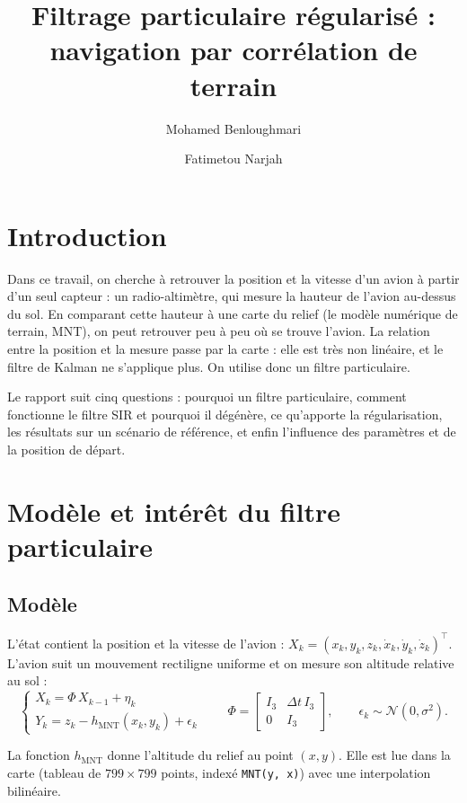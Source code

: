\documentclass[11pt]{article}
\title{Filtrage particulaire régularisé :\\ navigation par corrélation de terrain}
\author{Mohamed Benloughmari \and Fatimetou Narjah}
\date{}
\begin{document}
\maketitle

\section*{Introduction}

Dans ce travail, on cherche à retrouver la position et la vitesse d'un avion à partir d'un
seul capteur : un radio-altimètre, qui mesure la hauteur de l'avion au-dessus du sol.
En comparant cette hauteur à une carte du relief (le modèle numérique de terrain, MNT),
on peut retrouver peu à peu où se trouve l'avion. La relation entre la position et la
mesure passe par la carte : elle est très non linéaire, et le filtre de Kalman
ne s'applique plus. On utilise donc un filtre particulaire.

Le rapport suit cinq questions : pourquoi un filtre particulaire, comment fonctionne
le filtre SIR et pourquoi il dégénère, ce qu'apporte la régularisation, les résultats
sur un scénario de référence, et enfin l'influence des paramètres et de la position de départ.

\section{Modèle et intérêt du filtre particulaire}

\subsection{Modèle}

L'état contient la position et la vitesse de l'avion :
$X_k = (x_k, y_k, z_k, \dot x_k, \dot y_k, \dot z_k)^\top$. L'avion suit un mouvement
rectiligne uniforme et on mesure son altitude relative au sol :
\begin{equation}
\begin{cases}
X_k = \Phi\, X_{k-1} + \eta_k \\
Y_k = z_k - h_{\mathrm{MNT}}(x_k, y_k) + \epsilon_k
\end{cases}
\qquad
\Phi = \begin{bmatrix} I_3 & \Delta t\, I_3 \\ 0 & I_3 \end{bmatrix},
\qquad \epsilon_k \sim \mathcal{N}(0, \sigma^2).
\end{equation}

La fonction $h_{\mathrm{MNT}}$ donne l'altitude du relief au point $(x, y)$. Elle est lue
dans la carte (tableau de $799 \times 799$ points, indexé \texttt{MNT(y, x)}) avec une
interpolation bilinéaire.
\end{document}
